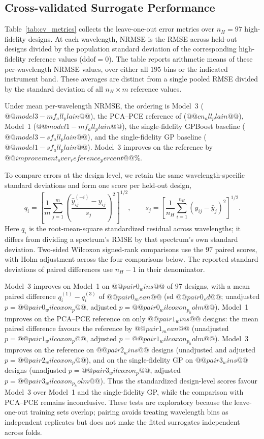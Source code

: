\subsection{Cross-validated Surrogate Performance}
\label{sec:cv_results}

Table~\ref{tab:cv_metrics} collects the leave-one-out error metrics over
$n_H=97$ high-fidelity designs. At each wavelength, NRMSE is the RMSE across
held-out designs divided by the population standard deviation of the
corresponding high-fidelity reference values ($\mathrm{ddof}=0$). The table
reports arithmetic means of these per-wavelength NRMSE values, over either
all $195$ bins or the indicated instrument band. These averages are distinct
from a single pooled RMSE divided by the standard deviation of all
$n_H\times m$ reference values.

Under mean per-wavelength NRMSE, the ordering is Model~3 ($@@model3-mf_all_plain@@$),
the PCA--PCE reference of \citet{Nussbaumer2026} ($@@cn_all_plain@@$),
Model~1 ($@@model1-mf_all_plain@@$), the single-fidelity GPBoost baseline
($@@model3-sf_all_plain@@$), and the single-fidelity GP baseline
($@@model1-sf_all_plain@@$). Model~3 improves on the reference by
$@@improvement_over_reference_percent@@\%$.

To compare errors at the design level, we retain the same wavelength-specific
standard deviations and form one score per held-out design,
\[
 q_i = \left[\frac{1}{m}\sum_{j=1}^{m}
 \left(\frac{\widehat{y}_{ij}^{(-i)}-y_{ij}}{s_j}\right)^2\right]^{1/2},
 \qquad
 s_j = \left[\frac{1}{n_H}\sum_{i=1}^{n_H}
 (y_{ij}-\bar y_j)^2\right]^{1/2}.
\]
Here $q_i$ is the root-mean-square standardized residual across wavelengths;
it differs from dividing a spectrum's RMSE by that spectrum's own standard
deviation. Two-sided Wilcoxon signed-rank comparisons use the $97$ paired
scores, with Holm adjustment across the four comparisons below. The reported
standard deviations of paired differences use $n_H-1$ in their denominator.

Model~3 improves on Model~1 on $@@pair0_wins@@$ of $97$ designs, with a mean
paired difference $q_i^{(1)}-q_i^{(3)}$ of $@@pair0_mean@@$
(sd $@@pair0_sd@@$; unadjusted $p=@@pair0_wilcoxon_p@@$,
adjusted $p=@@pair0_wilcoxon_p_holm@@$). Model~1 improves on the PCA--PCE
reference on only $@@pair1_wins@@$ designs: the mean paired difference
favours the reference by $@@pair1_mean@@$
(unadjusted $p=@@pair1_wilcoxon_p@@$,
adjusted $p=@@pair1_wilcoxon_p_holm@@$).
Model~3 improves on the reference on $@@pair2_wins@@$ designs
(unadjusted and adjusted $p=@@pair2_wilcoxon_p@@$), and on the
single-fidelity GP on $@@pair3_wins@@$ designs
(unadjusted $p=@@pair3_wilcoxon_p@@$,
adjusted $p=@@pair3_wilcoxon_p_holm@@$).
Thus the standardized design-level scores favour Model~3 over Model~1 and
the single-fidelity GP, while the comparison with PCA--PCE remains
inconclusive. These tests are exploratory because the leave-one-out training
sets overlap; pairing avoids treating wavelength bins as independent
replicates but does not make the fitted surrogates independent across folds.

